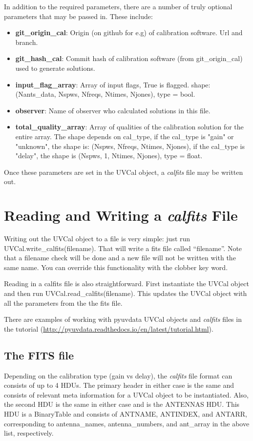\documentclass[11pt, oneside]{article}   	%
\begin{document}
In addition to the required parameters, there are a number of truly optional
parameters that may be passed in. These include:

\begin{itemize}
\item{\textbf{git\_origin\_cal}: Origin (on github for e.g) of calibration
    software. Url and branch.}
\item{\textbf{git\_hash\_cal}: Commit hash of calibration software (from
    git\_origin\_cal) used to generate solutions.}
\item{\textbf{input\_flag\_array}: Array of input flags, True is flagged. shape:
    (Nants\_data, Nspws, Nfreqs, Ntimes, Njones), type = bool.}
\item{\textbf{observer}: Name of observer who calculated solutions in this
    file.}
\item{\textbf{total\_quality\_array}: Array of qualities of the calibration
    solution for the entire array. The shape depends on cal\_type, if the cal\_type is
    "gain" or "unknown", the shape is: (Nspws, Nfreqs, Ntimes, Njones), if the 
    cal\_type is "delay", the shape is (Nspws, 1, Ntimes, Njones), type = float.}
\end{itemize}

Once these parameters are set in the UVCal object, a \textit{calfits} file may
be written out.

\section{Reading and Writing a \textit{calfits} File}
Writing out the UVCal object to a file is very simple: just run
UVCal.write\_calfits(filename). That will write a fits file called
``filename''. Note that a filename check will be done and a new file will not be
written with the same name. You can override this functionality with the clobber
key word.

Reading in a calfits file is also straightforward. First instantiate the UVCal object and
then run UVCal.read\_calfits(filename). This updates the UVCal object with all
the parameters from the the fits file.

There are examples of working with pyuvdata UVCal objects and \textit{calfits} files in
the tutorial (\url{http://pyuvdata.readthedocs.io/en/latest/tutorial.html}).

\subsection{The FITS file}
Depending on the calibration type (gain vs delay), the \textit{calfits} file
format can consists of up to 4 HDUs. The primary header in either case is the
same and consists of relevant meta information for a UVCal object to be
instantiated. Also, the second HDU is the same in either case and is the ANTENNAS
HDU. This HDU is a BinaryTable and consists of ANTNAME, ANTINDEX, and ANTARR,
corresponding to antenna\_names, antenna\_numbers, and ant\_array in the above
list, respectively.
\end{document}
